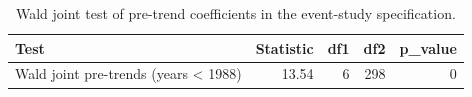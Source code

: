 \begin{table}

\caption{Wald joint test of pre-trend coefficients in the event-study specification.}
\centering
\begin{tabular}[t]{lrrrr}
\toprule
Test & Statistic & df1 & df2 & p\_value\\
\midrule
Wald joint pre-trends (years < 1988) & 13.54 & 6 & 298 & 0\\
\bottomrule
\end{tabular}
\end{table}
